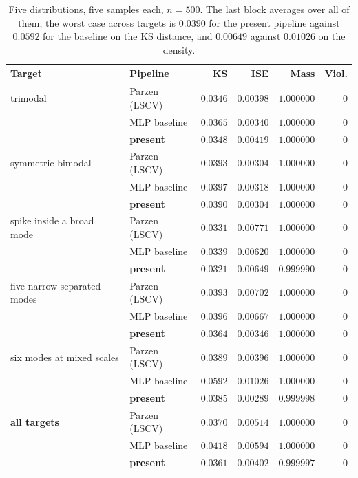 \documentclass[11pt]{article}
\begin{document}
\begin{table}[H]
\centering
\begin{tabular}{@{}llrrrr@{}}
\toprule
\textbf{Target} & \textbf{Pipeline} & \textbf{KS} & \textbf{ISE} & \textbf{Mass} &
\textbf{Viol.} \\
\midrule
trimodal & Parzen (LSCV) & $0.0346$ & $0.00398$ & $1.000000$ & 0 \\
         & MLP baseline  & $0.0365$ & $\mathbf{0.00340}$ & $1.000000$ & 0 \\
         & \textbf{present} & $0.0348$ & $0.00419$ & $1.000000$ & 0 \\
\addlinespace
symmetric bimodal & Parzen (LSCV) & $0.0393$ & $0.00304$ & $1.000000$ & 0 \\
         & MLP baseline  & $0.0397$ & $0.00318$ & $1.000000$ & 0 \\
         & \textbf{present} & $\mathbf{0.0390}$ & $\mathbf{0.00304}$ & $1.000000$ & 0 \\
\addlinespace
spike inside a broad mode & Parzen (LSCV) & $0.0331$ & $0.00771$ & $1.000000$ & 0 \\
         & MLP baseline  & $0.0339$ & $\mathbf{0.00620}$ & $1.000000$ & 0 \\
         & \textbf{present} & $\mathbf{0.0321}$ & $0.00649$ & $0.999990$ & 0 \\
\addlinespace
five narrow separated modes & Parzen (LSCV) & $0.0393$ & $0.00702$ & $1.000000$ & 0 \\
         & MLP baseline  & $0.0396$ & $0.00667$ & $1.000000$ & 0 \\
         & \textbf{present} & $\mathbf{0.0364}$ & $\mathbf{0.00346}$ & $1.000000$ & 0 \\
\addlinespace
six modes at mixed scales & Parzen (LSCV) & $0.0389$ & $0.00396$ & $1.000000$ & 0 \\
         & MLP baseline  & $0.0592$ & $0.01026$ & $1.000000$ & 0 \\
         & \textbf{present} & $\mathbf{0.0385}$ & $\mathbf{0.00289}$ & $0.999998$ & 0 \\
\midrule
\textbf{all targets} & Parzen (LSCV) & $0.0370$ & $0.00514$ & $1.000000$ & 0 \\
         & MLP baseline  & $0.0418$ & $0.00594$ & $1.000000$ & 0 \\
         & \textbf{present} & $\mathbf{0.0361}$ & $\mathbf{0.00402}$ & $0.999997$ & 0 \\
\bottomrule
\end{tabular}
\caption{Five distributions, five samples each, $n = 500$. The last block averages over all
of them; the worst case across targets is $0.0390$ for the present pipeline against $0.0592$
for the baseline on the KS distance, and $0.00649$ against $0.01026$ on the density.}
\label{tab:endtoend}
\end{table}
\end{document}

